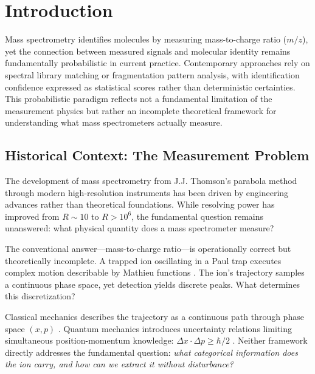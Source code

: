 \section{Introduction}

Mass spectrometry identifies molecules by measuring mass-to-charge ratio ($m/z$), yet the connection between measured signals and molecular identity remains fundamentally probabilistic in current practice. Contemporary approaches rely on spectral library matching or fragmentation pattern analysis, with identification confidence expressed as statistical scores rather than deterministic certainties. This probabilistic paradigm reflects not a fundamental limitation of the measurement physics but rather an incomplete theoretical framework for understanding what mass spectrometers actually measure.

\subsection{Historical Context: The Measurement Problem}

The development of mass spectrometry from J.J. Thomson's parabola method \citep{thomson1913rays} through modern high-resolution instruments \citep{gross2017mass,hoffmann2007mass} has been driven by engineering advances rather than theoretical foundations. While resolving power has improved from $R \sim 10$ to $R > 10^6$, the fundamental question remains unanswered: what physical quantity does a mass spectrometer measure?

The conventional answer---mass-to-charge ratio---is operationally correct but theoretically incomplete. A trapped ion oscillating in a Paul trap executes complex motion describable by Mathieu functions \citep{paul1990electromagnetic,march2005quadrupole}. The ion's trajectory samples a continuous phase space, yet detection yields discrete peaks. What determines this discretization?

Classical mechanics describes the trajectory as a continuous path through phase space $(x, p)$ \citep{goldstein2002classical,arnold1989mathematical}. Quantum mechanics introduces uncertainty relations limiting simultaneous position-momentum knowledge: $\Delta x \cdot \Delta p \geq \hbar/2$ \citep{dirac1981principles,sakurai2017modern}. Neither framework directly addresses the fundamental question: \emph{what categorical information does the ion carry, and how can we extract it without disturbance?}

